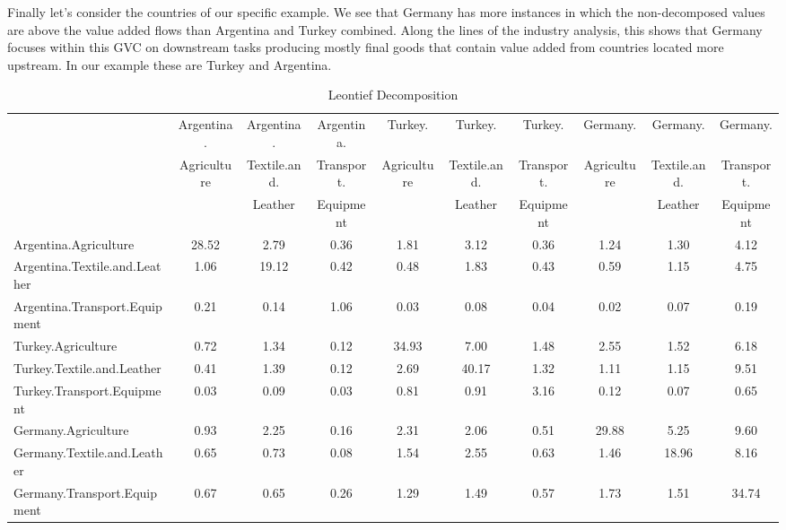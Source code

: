\documentclass{article}\usepackage[]{graphicx}\usepackage[]{color}
\begin{document}
Finally let's consider the countries of our specific example. We see that Germany has more instances in which the non-decomposed values are above the value added flows than Argentina and Turkey combined. Along the lines of the industry analysis, this shows that Germany focuses within this GVC on downstream tasks producing mostly final goods that contain value added from countries located more upstream. In our example these are Turkey and Argentina.

\newpage
\begin{table}[htbp] \scriptsize
    \begin{adjustwidth}{-1.15in}{-1.15in}  
  \centering
  \caption{Leontief Decomposition}
    \begin{tabular}{lccccccccc}
    \toprule
          & Argentina. & Argentina. & Argentina. & Turkey. & Turkey. & Turkey. & Germany. & Germany. & Germany.\\
          & Agriculture & Textile.and. & Transport. & Agriculture & Textile.and. & Transport. & Agriculture & Textile.and. & Transport.\\
          & & Leather & Equipment & & Leather & Equipment & & Leather & Equipment\\
    \midrule
    Argentina.Agriculture & 28.52 & 2.79  & 0.36  & 1.81  & 3.12  & 0.36  & 1.24  & 1.30  & 4.12 \\
    Argentina.Textile.and.Leather & 1.06  & 19.12 & 0.42  & 0.48  & 1.83  & 0.43  & 0.59  & 1.15  & 4.75 \\
    Argentina.Transport.Equipment & 0.21  & 0.14  & 1.06  & 0.03  & 0.08  & 0.04  & 0.02  & 0.07  & 0.19 \\
    Turkey.Agriculture & 0.72  & 1.34  & 0.12  & 34.93 & 7.00  & 1.48  & 2.55  & 1.52  & 6.18 \\
    Turkey.Textile.and.Leather & 0.41  & 1.39  & 0.12  & 2.69  & 40.17 & 1.32  & 1.11  & 1.15  & 9.51 \\
    Turkey.Transport.Equipment & 0.03  & 0.09  & 0.03  & 0.81  & 0.91  & 3.16  & 0.12  & 0.07  & 0.65 \\
    Germany.Agriculture & 0.93  & 2.25  & 0.16  & 2.31  & 2.06  & 0.51  & 29.88 & 5.25  & 9.60 \\
    Germany.Textile.and.Leather & 0.65  & 0.73  & 0.08  & 1.54  & 2.55  & 0.63  & 1.46  & 18.96 & 8.16 \\
    Germany.Transport.Equipment & 0.67  & 0.65  & 0.26  & 1.29  & 1.49  & 0.57  & 1.73  & 1.51  & 34.74 \\
    \bottomrule
    \end{tabular}
  \label{tab:leon}
      \end{adjustwidth}
\end{table}
\end{document}
